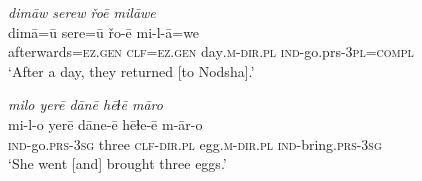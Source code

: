 \ea \label{ŠJ.42}
\textit{dimāw serew řoē milāwe} \\ 
\gll dimā=ū sere=ū řo-ē mi-l-ā=we \\ 
 afterwards\textsc{=ez.gen} \textsc{clf}\textsc{=ez.gen} day\textsc{.m}\textsc{-dir}\textsc{.pl} \textsc{ind-}go.prs\textsc{-3pl}\textsc{=compl} \\ 
\glt `After a day, they returned [to Nodsha].'
\z 
 
\ea \label{ŽH.81}
\textit{milo yerē dānē hēɫē māro} \\ 
\gll mi-l-o yerē dāne-ē hēɫe-ē m-ār-o \\ 
 \textsc{ind-}go\textsc{.prs}\textsc{-3sg} three \textsc{clf}\textsc{-dir}\textsc{.pl} egg\textsc{.m}\textsc{-dir}\textsc{.pl} \textsc{ind-}bring\textsc{.prs}\textsc{-3sg} \\ 
\glt `She went [and] brought three eggs.'
\z 
 
